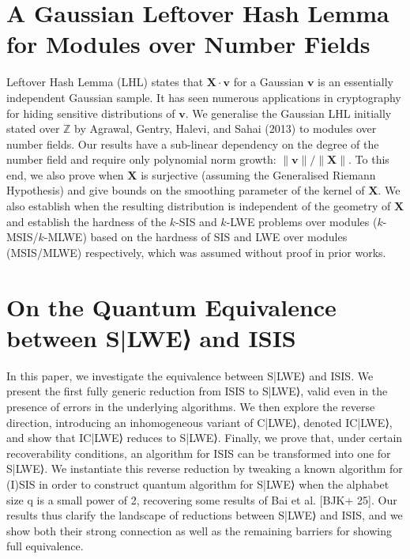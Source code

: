 \documentclass[11pt,oneside]{book}
\theoremstyle{definition}
\theoremstyle{remark}
\theoremstyle{plain}
\begin{document}
\section{\cite{cryptoeprint:2025/1852} A Gaussian Leftover Hash Lemma for Modules over Number Fields}
Leftover Hash Lemma (LHL) states that \(\mathbf{X} \cdot \mathbf{v}\) for a Gaussian \(\mathbf{v}\) is an essentially independent Gaussian sample. It has seen numerous applications in cryptography for hiding sensitive distributions of \(\mathbf{v}\). We generalise the Gaussian LHL initially stated over \(\mathbb{Z}\) by Agrawal, Gentry, Halevi, and Sahai (2013) to modules over number fields. Our results have a sub-linear dependency on the degree of the number field and require only polynomial norm growth: \(\lVert\mathbf{v}\rVert/\lVert\mathbf{X}\rVert\). To this end, we also prove when \(\mathbf{X}\) is surjective (assuming the Generalised Riemann Hypothesis) and give bounds on the smoothing parameter of the kernel of \(\mathbf{X}\). We also establish when the resulting distribution is independent of the geometry of \(\mathbf{X}\) and establish the hardness of the \(k\)-SIS and \(k\)-LWE problems over modules (\(k\)-MSIS/\(k\)-MLWE) based on the hardness of SIS and LWE over modules (MSIS/MLWE) respectively, which was assumed without proof in prior works.

\section{\cite{cryptoeprint:2025/1857} On the Quantum Equivalence between S|LWE⟩ and ISIS}
In this paper, we investigate the equivalence between S|LWE⟩ and ISIS. We present the first fully generic reduction from ISIS to S|LWE⟩, valid even in the presence of errors in the underlying algorithms. We then explore the reverse direction, introducing an inhomogeneous variant of C|LWE⟩, denoted IC|LWE⟩, and show that IC|LWE⟩ reduces to S|LWE⟩. Finally, we prove that, under certain recoverability conditions, an algorithm for ISIS can be transformed into one for S|LWE⟩. We instantiate this reverse reduction by tweaking a known algorithm for (I)SIS in order to construct quantum algorithm for S|LWE⟩ when the alphabet size q is a small power of 2, recovering some results of Bai et al. [BJK+ 25]. Our results thus clarify the landscape of reductions between S|LWE⟩ and ISIS, and we show both their strong connection as well as the remaining barriers for showing full equivalence.
\end{document}
